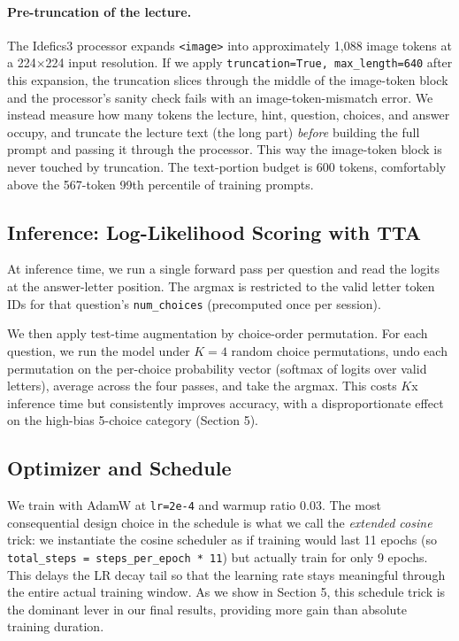 \documentclass[11pt]{article}
\begin{document}
\paragraph{Pre-truncation of the lecture.} The Idefics3 processor expands \texttt{<image>} into approximately 1,088 image tokens at a 224$\times$224 input resolution. If we apply \texttt{truncation=True, max\_length=640} after this expansion, the truncation slices through the middle of the image-token block and the processor's sanity check fails with an image-token-mismatch error. We instead measure how many tokens the lecture, hint, question, choices, and answer occupy, and truncate the lecture text (the long part) \emph{before} building the full prompt and passing it through the processor. This way the image-token block is never touched by truncation. The text-portion budget is 600 tokens, comfortably above the 567-token 99th percentile of training prompts.

\subsection{Inference: Log-Likelihood Scoring with TTA}

At inference time, we run a single forward pass per question and read the logits at the answer-letter position. The argmax is restricted to the valid letter token IDs for that question's \texttt{num\_choices} (precomputed once per session).

We then apply test-time augmentation by choice-order permutation. For each question, we run the model under \(K{=}4\) random choice permutations, undo each permutation on the per-choice probability vector (softmax of logits over valid letters), average across the four passes, and take the argmax. This costs \(K\)x inference time but consistently improves accuracy, with a disproportionate effect on the high-bias 5-choice category (Section 5).

\subsection{Optimizer and Schedule}

We train with AdamW at \texttt{lr=2e-4} and warmup ratio 0.03. The most consequential design choice in the schedule is what we call the \emph{extended cosine} trick: we instantiate the cosine scheduler as if training would last 11 epochs (so \texttt{total\_steps = steps\_per\_epoch * 11}) but actually train for only 9 epochs. This delays the LR decay tail so that the learning rate stays meaningful through the entire actual training window. As we show in Section 5, this schedule trick is the dominant lever in our final results, providing more gain than absolute training duration.
\end{document}

